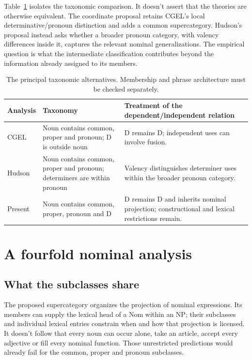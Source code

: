 \documentclass[12pt]{article}
\begin{document}
Table~\ref{tab:rivals} isolates the taxonomic comparison. It doesn't assert that the theories are otherwise equivalent. The coordinate proposal retains CGEL's local determinative/pronoun distinction and adds a common supercategory. Hudson's proposal instead asks whether a broader pronoun category, with valency differences inside it, captures the relevant nominal generalizations. The empirical question is what the intermediate classification contributes beyond the information already assigned to its members.

\begin{table}[tb]
\centering\small
\caption{The principal taxonomic alternatives. Membership and phrase architecture must be checked separately.}\label{tab:rivals}
\begin{tabular}{p{2.1cm}p{4.5cm}p{5.1cm}}
\toprule
Analysis & Taxonomy & Treatment of the dependent/independent relation \\
\midrule
CGEL & Noun contains common, proper and pronoun; D is outside noun & D remains D; independent uses can involve fusion. \\
Hudson & Noun contains common, proper and pronoun; determiners are within pronoun & Valency distinguishes determiner uses within the broader pronoun category. \\
Present & Noun contains common, proper, pronoun and D & D remains D and inherits nominal projection; constructional and lexical restrictions remain. \\
\bottomrule
\end{tabular}
\end{table}

\section{A fourfold nominal analysis}\label{sec:proposal}

\subsection{What the subclasses share}

The proposed supercategory organizes the projection of nominal expressions. Its members can supply the lexical head of a Nom within an NP; their subclasses and individual lexical entries constrain when and how that projection is licensed. It doesn't follow that every noun can occur alone, take an article, accept every adjective or fill every nominal function. Those unrestricted predictions would already fail for the common, proper and pronoun subclasses.
\end{document}
